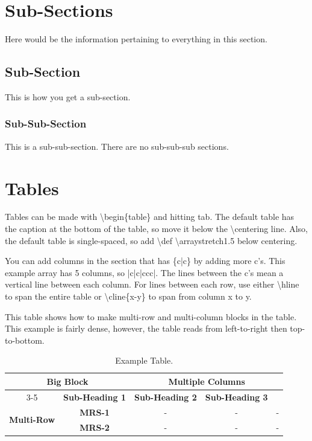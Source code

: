 \documentclass{article}
\begin{document}
\clearpage
\section{Sub-Sections}
Here would be the information pertaining to everything in this section.

\subsection{Sub-Section}
This is how you get a sub-section.

\subsubsection{Sub-Sub-Section}
This is a sub-sub-section. There are no sub-sub-sub sections.


\section{Tables}
Tables can be made with \textbackslash begin\{table\} and hitting tab. The default table has the caption at the bottom of the table, so move it below the \textbackslash centering line. Also, the default table is single-spaced, so add \textbackslash def \textbackslash arraystretch{1.5} below centering.

You can add columns in the section that has \{c|c\} by adding more c's. This example array has 5 columns, so |c|c|ccc|. The lines between the c's mean a vertical line between each column. For lines between each row, use either \textbackslash hline to span the entire table or \textbackslash cline\{x-y\} to span from column x to y.

This table shows how to make multi-row and multi-column blocks in the table. This example is fairly dense, however, the table reads from left-to-right then top-to-bottom.

\begin{table}[!h]
    \centering
    \def\arraystretch{1.5}
    \caption{Example Table.}
    \begin{tabular}{|c|c|ccc|} \hline
        \multicolumn{2}{|c|}{\multirow{2}{*}{\bf Big Block}} & \multicolumn{3}{|c|}{\bf Multiple Columns} \\ \cline{3-5}
        
        \multicolumn{2}{|c|}{\multirow{2}{*}{ \ }} & {\bf Sub-Heading 1} & {\bf Sub-Heading 2} & {\bf Sub-Heading 3} \\ \hline
        
        \multirow{2}{*}{\bf Multi-Row} & {\bf MRS-1} & - & - & - \\ \cline{3-5}
        
        \ & {\bf MRS-2} & - & - & - \\ \hline
    \end{tabular}
    \label{tab:example-table}
\end{table}
\end{document}
